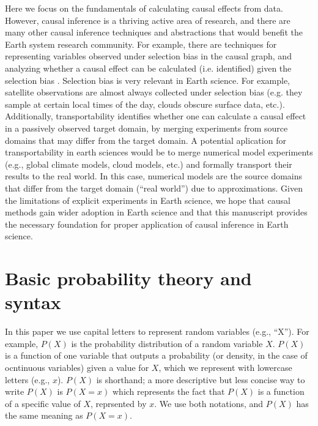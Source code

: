 \documentclass[12pt]{article}
\begin{document}
Here we focus on the fundamentals of calculating causal effects from
data. However, causal inference is a thriving active area of research,
and there are many other causal inference techniques and abstractions
that would benefit the Earth system research community. For example,
there are techniques for representing variables observed under
selection bias in the causal graph, and analyzing whether a causal
effect can be calculated (i.e. identified) given the selection bias
\citep[e.g.,][]{bareinboim2014recovering}. Selection bias is very
relevant in Earth science. For example, satellite observations are
almost always collected under selection bias (e.g. they sample at
certain local times of the day, clouds obscure surface data,
etc.). Additionally, transportability
\citep[e.g.,][]{bareinboim2012transportability} identifies whether one
can calculate a causal effect in a passively observed target domain,
by merging experiments from source domains that may differ from the
target domain. A potential aplication for transportability in earth
sciences would be to merge numerical model experiments (e.g., global
climate models, cloud models, etc.) and formally transport their
results to the real world. In this case, numerical models are the
source domains that differ from the target domain (``real world'') due
to approximations. Given the limitations of explicit experiments in
Earth science, we hope that causal methods gain wider adoption in
Earth science and that this manuscript provides the necessary
foundation for proper application of causal inference in Earth
science.





\appendix
\section{Basic probability theory and syntax}
\label{prob-theory}

In this paper we use capital letters to represent random variables
(e.g., ``X''). For example, $P(X)$ is the probability distribution of
a random variable $X$. $P(X)$ is a function of one variable that
outputs a probability (or density, in the case of ocntinuous
variables) given a value for $X$, which we represent with lowercase
letters (e.g., $x$). $P(X)$ is shorthand; a more descriptive but less
concise way to write $P(X)$ is $P(X=x)$ which represents the fact that
$P(X)$ is a function of a specific value of $X$, reprsented by $x$. We
use both notations, and $P(X)$ has the same meaning as $P(X=x)$.
\end{document}
